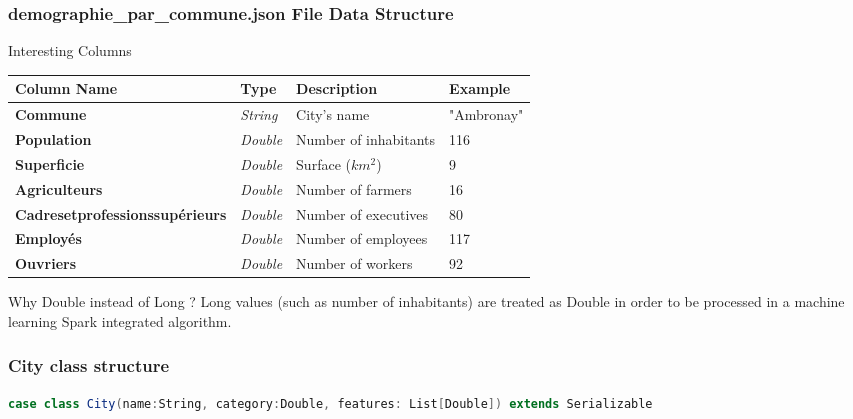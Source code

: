 \documentclass[slidetop,9pt,utf8]{beamer}
\begin{document}
\begin{CJK}{UTF8}{gbsn}
\begin{frame}
  

\end{frame}

\begin{frame}

  \frametitle{demographie\_par\_commune.json File Data Structure}

  \begin{block}{Interesting Columns}
    \begin{tabular}{|l|l|l|l|}
          \hline 
          \rowcolor{gray} \textbf{Column Name} & \textbf{Type} & \textbf{Description} & \textbf{Example} \\ \hline
          \textbf{Commune} & \textit{String} & City's name & "Ambronay" \\ \hline
          \textbf{Population} & \textit{Double} & Number of inhabitants & 116 \\ \hline
          \textbf{Superficie} & \textit{Double} & Surface ($km^{2}$) & 9 \\ \hline
          \textbf{Agriculteurs} & \textit{Double} & Number of farmers & 16 \\ \hline
          \textbf{Cadresetprofessionssupérieurs} & \textit{Double} & Number of executives & 80 \\ \hline
          \textbf{Employés} & \textit{Double} & Number of employees & 117 \\ \hline
          \textbf{Ouvriers} & \textit{Double} & Number of workers & 92 \\ \hline
    \end{tabular}
  \end{block}

  \begin{block}{Why Double instead of Long ?}
    Long values (such as number of inhabitants) are treated as Double in order to be processed in a machine learning Spark integrated algorithm.
  \end{block}

\end{frame}

\begin{frame}[fragile]

  \frametitle{City class structure}

  \begin{lstlisting}[label=CityClassOverview, caption=psug.hands.on.exercise05.City class overview, language=scala, style=code]
case class City(name:String, category:Double, features: List[Double]) extends Serializable
  \end{lstlisting}


\end{frame}
\end{CJK}
\end{document}
